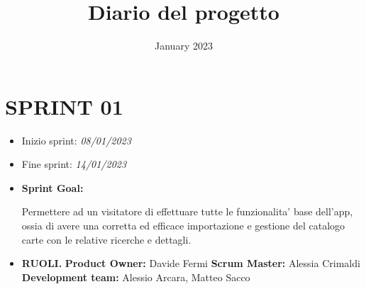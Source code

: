 \documentclass{article}
\title{Diario del progetto}
\date{January 2023}
\begin{document}
    \maketitle

    \section{SPRINT 01}

    \begin{itemize}
        \item Inizio sprint: \textit{08/01/2023}
        \item Fine sprint: \textit{14/01/2023}
    \end{itemize}

    \begin{itemize}
        \item \textbf{Sprint Goal:}
        \begin{indent}
            \newline Permettere ad un visitatore di effettuare tutte le funzionalita' base dell'app, ossia di avere una corretta ed efficace importazione e gestione del catalogo carte con le relative ricerche e dettagli.
        \end{indent}
    \end{itemize}

    \begin{itemize}
        \item \textbf{RUOLI.}
        \newline \textbf{Product Owner:} Davide Fermi
        \newline \textbf{Scrum Master:} Alessia Crimaldi
        \newline \textbf{Development team:} Alessio Arcara, Matteo Sacco
    \end{itemize}
\end{document}
